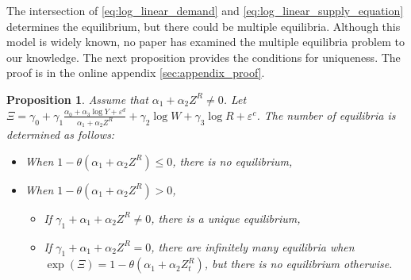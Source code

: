 \documentclass[11pt, a4paper]{article}
\newtheorem{proposition}{Proposition}
\theoremstyle{remark}
\begin{document}
The intersection of \eqref{eq:log_linear_demand} and \eqref{eq:log_linear_supply_equation} determines the equilibrium, but there could be multiple equilibria.
Although this model is widely known, no paper has examined the multiple equilibria problem to our knowledge.
The next proposition provides the conditions for uniqueness.
The proof is in the online appendix \ref{sec:appendix_proof}.
\begin{proposition}\label{prop:equilibrium_existence}
    Assume that $\alpha_1 + \alpha_2 Z^{R}\ne 0$. Let $\Xi = \gamma_0 + \gamma_1\frac{\alpha_0 + \alpha_3 \log Y + \varepsilon^{d}}{\alpha_1 + \alpha_2 Z^{R}} +  \gamma_2 \log W + \gamma_3 \log R + \varepsilon^{c}$.
    The number of equilibria is determined as follows:
    \begin{itemize}
        \item When $1 - \theta (\alpha_1 + \alpha_2 Z^{R}) \le 0$, there is no equilibrium,
        \item When $1 - \theta (\alpha_1 + \alpha_2 Z^{R}) >0$, 
        \begin{itemize}
            \item If $ \gamma_1 +\alpha_1+\alpha_2 Z^R \ne 0$, there is a unique equilibrium,
            \item If $\gamma_1 + \alpha_1+\alpha_2 Z^R = 0$, there are infinitely many equilibria when $\exp(\Xi) = 1 - \theta (\alpha_1 + \alpha_2 Z^{R}_{t})$, but there is no equilibrium otherwise.
        \end{itemize}
    \end{itemize}
\end{proposition}




\end{document}
